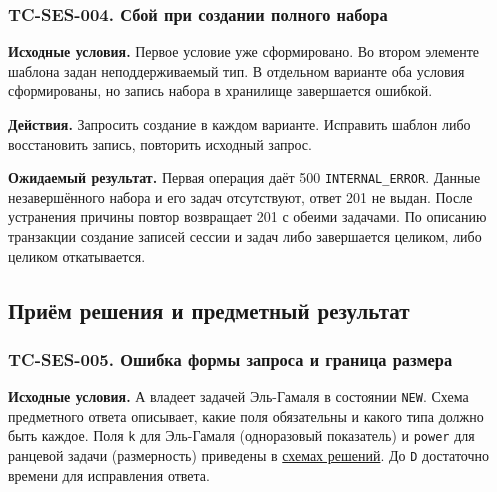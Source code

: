 \documentclass[12pt,a4paper]{article}
\begin{document}
\subsubsection{TC-SES-004. Сбой при создании полного набора}\label{tc-ses-004-ux441ux431ux43eux439-ux43fux440ux438-ux441ux43eux437ux434ux430ux43dux438ux438-ux43fux43eux43bux43dux43eux433ux43e-ux43dux430ux431ux43eux440ux430}

\hypertarget{tc-ses-004-сбой-при-создании-полного-набора}{}

\hypertarget{tc-ses-004}{}

\textbf{Исходные условия.} Первое условие уже сформировано. Во втором элементе шаблона задан неподдерживаемый тип. В отдельном варианте оба условия сформированы, но запись набора в хранилище завершается ошибкой.

\textbf{Действия.} Запросить создание в каждом варианте. Исправить шаблон либо восстановить запись, повторить исходный запрос.

\textbf{Ожидаемый результат.} Первая операция даёт 500 \texttt{INTERNAL\_\allowbreak{}ERROR}. Данные незавершённого набора и его задач отсутствуют, ответ 201 не выдан. После устранения причины повтор возвращает 201 с обеими задачами. По описанию транзакции создание записей сессии и задач либо завершается целиком, либо целиком откатывается.

\subsection{Приём решения и предметный результат}\label{ux43fux440ux438ux451ux43c-ux440ux435ux448ux435ux43dux438ux44f-ux438-ux43fux440ux435ux434ux43cux435ux442ux43dux44bux439-ux440ux435ux437ux443ux43bux44cux442ux430ux442}

\hypertarget{приём-решения-и-предметный-результат}{}

\subsubsection{TC-SES-005. Ошибка формы запроса и граница размера}\label{tc-ses-005-ux43eux448ux438ux431ux43aux430-ux444ux43eux440ux43cux44b-ux437ux430ux43fux440ux43eux441ux430-ux438-ux433ux440ux430ux43dux438ux446ux430-ux440ux430ux437ux43cux435ux440ux430}

\hypertarget{tc-ses-005-ошибка-формы-запроса-и-граница-размера}{}

\hypertarget{tc-ses-005}{}

\textbf{Исходные условия.} А владеет задачей Эль-Гамаля в состоянии \texttt{NEW}. Схема предметного ответа описывает, какие поля обязательны и какого типа должно быть каждое. Поля \texttt{k} для Эль-Гамаля (одноразовый показатель) и \texttt{power} для ранцевой задачи (размерность) приведены в {\href{../07\_Программные\_требования/DOC-06.2\_Сессии\_задач\_и\_планировщик.pdf\#предметный-ответ}{схемах решений}}. До \texttt{D} достаточно времени для исправления ответа.
\end{document}
